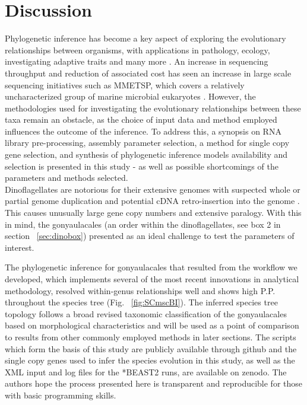 \documentclass[12pt]{article}
\begin{document}
\section{Discussion}
Phylogenetic inference has become a key aspect of exploring the evolutionary relationships between organisms, with applications in pathology, ecology, investigating adaptive traits and many more \cite{heath2008taxon}.%
An increase in sequencing throughput and reduction of associated cost has seen an increase in large scale sequencing initiatives such as MMETSP, which covers a relatively uncharacterized group of marine microbial eukaryotes \cite{keeling2014marine}. %
However, the methodologies used for investigating the evolutionary relationships between these taxa remain an obstacle, as the choice of input data and method employed influences the outcome of the inference. 
To address this, a synopsis on RNA library pre-processing, assembly parameter selection, a method for single copy gene selection, and synthesis of phylogenetic inference models availability and selection is presented in this study - as well as possible shortcomings of the parameters and methods selected. \\
Dinoflagellates are notorious for their extensive genomes with suspected whole or partial genome duplication and potential cDNA retro-insertion into the genome \cite{van2009florida,beauchemin2012dinoflagellate,slamovits2008widespread,hou2009distinct,lin2011genomic}. 
This causes unusually large gene copy numbers and extensive paralogy. 
With this in mind, the gonyaulacales (an order within the dinoflagellates, see box 2  in section ~\ref{sec:dinobox}) presented as an ideal challenge to test the parameters of interest.

The phylogenetic inference for gonyaulacales that resulted from the workflow we developed, which implements several of the most recent innovations in analytical methodology, resolved within-genus relationships well and shows high P.P. throughout the species tree (Fig. ~\ref{fig:SCmscBI}). %
The inferred species tree topology follows a broad revised taxonomic classification of the gonyaulacales based on morphological characteristics \cite{hoppenrath2017dinoflagellate} and will be used as a point of comparison to results from other commonly employed methods in later sections. 
The scripts which form the basis of this study are publicly available through github and the single copy genes used to infer the species evolution in this study, as well as the XML input and log files for the *BEAST2 runs, are available on zenodo. 
The authors hope the process presented here is transparent and reproducible for those with basic programming skills. 
\end{document}
